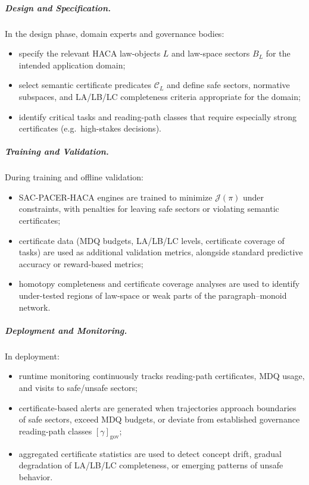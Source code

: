 \documentclass[11pt]{book}
\theoremstyle{plain}
\theoremstyle{definition}
\theoremstyle{remark}
\begin{document}
\subparagraph{Design and Specification.}
In the design phase, domain experts and governance bodies:
\begin{itemize}
  \item specify the relevant HACA law-objects $L$ and law-space
        sectors $B_L$ for the intended application domain;
  \item select semantic certificate predicates $\mathcal{C}_L$ and
        define safe sectors, normative subspaces, and LA/LB/LC
        completeness criteria appropriate for the domain;
  \item identify critical tasks and reading-path classes that require
        especially strong certificates (e.g.\ high-stakes decisions).
\end{itemize}

\subparagraph{Training and Validation.}
During training and offline validation:
\begin{itemize}
  \item SAC-PACER-HACA engines are trained to minimize $\mathcal{J}(\pi)$
        under constraints, with penalties for leaving safe sectors or
        violating semantic certificates;
  \item certificate data (MDQ budgets, LA/LB/LC levels, certificate
        coverage of tasks) are used as additional validation metrics,
        alongside standard predictive accuracy or reward-based metrics;
  \item homotopy completeness and certificate coverage analyses are
        used to identify under-tested regions of law-space or weak
        parts of the paragraph–monoid network.
\end{itemize}

\subparagraph{Deployment and Monitoring.}
In deployment:
\begin{itemize}
  \item runtime monitoring continuously tracks reading-path
        certificates, MDQ usage, and visits to safe/unsafe sectors;
  \item certificate-based alerts are generated when trajectories
        approach boundaries of safe sectors, exceed MDQ budgets, or
        deviate from established governance reading-path classes
        $[\gamma]_{\mathrm{gov}}$;
  \item aggregated certificate statistics are used to detect concept
        drift, gradual degradation of LA/LB/LC completeness, or
        emerging patterns of unsafe behavior.
\end{itemize}
\end{document}
